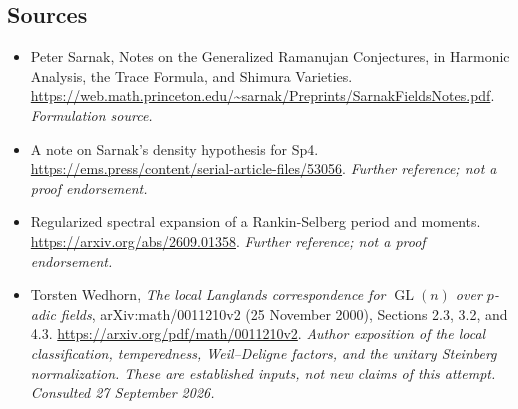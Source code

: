 \documentclass[11pt]{article}
\begin{document}
\subsection{Sources}
\begin{itemize}
\item[S1]Peter Sarnak, Notes on the Generalized Ramanujan Conjectures, in Harmonic Analysis, the Trace Formula, and Shimura Varieties.
\url{https://web.math.princeton.edu/~sarnak/Preprints/SarnakFieldsNotes.pdf}.
\textit{Formulation source.}
\item[S2]A note on Sarnak's density hypothesis for Sp4.
\url{https://ems.press/content/serial-article-files/53056}.
\textit{Further reference; not a proof endorsement.}
\item[S3]Regularized spectral expansion of a Rankin-Selberg period and moments.
\url{https://arxiv.org/abs/2609.01358}.
\textit{Further reference; not a proof endorsement.}

\item[E1]Torsten Wedhorn, \emph{The local Langlands correspondence for
$\operatorname{GL}(n)$ over $p$-adic fields}, arXiv:math/0011210v2
(25 November 2000), Sections 2.3, 3.2, and 4.3.
\url{https://arxiv.org/pdf/math/0011210v2}.
\textit{Author exposition of the local classification, temperedness,
Weil--Deligne factors, and the unitary Steinberg normalization. These are
established inputs, not new claims of this attempt.
Consulted 27 September 2026.}
\end{itemize}
\end{document}
